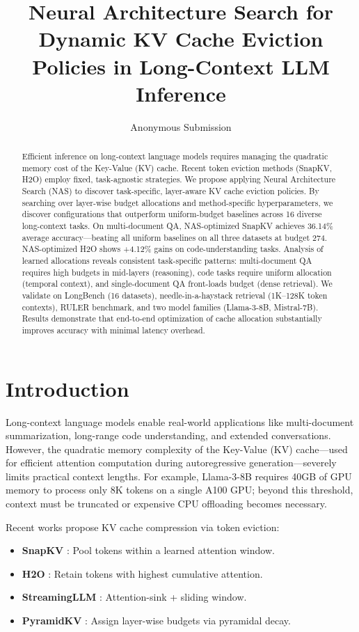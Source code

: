 \documentclass[11pt,a4paper]{article}
\title{Neural Architecture Search for Dynamic KV Cache Eviction Policies in Long-Context LLM Inference}
\author{Anonymous Submission}
\date{}
\begin{document}
\maketitle

\begin{abstract}
Efficient inference on long-context language models requires managing the quadratic memory cost of the Key-Value (KV) cache. Recent token eviction methods (SnapKV, H2O) employ fixed, task-agnostic strategies. We propose applying Neural Architecture Search (NAS) to discover task-specific, layer-aware KV cache eviction policies. By searching over layer-wise budget allocations and method-specific hyperparameters, we discover configurations that outperform uniform-budget baselines across 16 diverse long-context tasks. On multi-document QA, NAS-optimized SnapKV achieves 36.14\% average accuracy—beating all uniform baselines on all three datasets at budget 274. NAS-optimized H2O shows +4.12\% gains on code-understanding tasks. Analysis of learned allocations reveals consistent task-specific patterns: multi-document QA requires high budgets in mid-layers (reasoning), code tasks require uniform allocation (temporal context), and single-document QA front-loads budget (dense retrieval). We validate on LongBench (16 datasets), needle-in-a-haystack retrieval (1K–128K token contexts), RULER benchmark, and two model families (Llama-3-8B, Mistral-7B). Results demonstrate that end-to-end optimization of cache allocation substantially improves accuracy with minimal latency overhead.
\end{abstract}

\section{Introduction}

Long-context language models enable real-world applications like multi-document summarization, long-range code understanding, and extended conversations. However, the quadratic memory complexity of the Key-Value (KV) cache—used for efficient attention computation during autoregressive generation—severely limits practical context lengths. For example, Llama-3-8B requires 40GB of GPU memory to process only 8K tokens on a single A100 GPU; beyond this threshold, context must be truncated or expensive CPU offloading becomes necessary.

Recent works propose KV cache compression via token eviction:
\begin{itemize}
    \item \textbf{SnapKV} \citep{Li2024}: Pool tokens within a learned attention window.
    \item \textbf{H2O} \citep{Zhang2023}: Retain tokens with highest cumulative attention.
    \item \textbf{StreamingLLM} \citep{Su2023}: Attention-sink + sliding window.
    \item \textbf{PyramidKV} \citep{Cai2024}: Assign layer-wise budgets via pyramidal decay.
\end{itemize}
\end{document}
